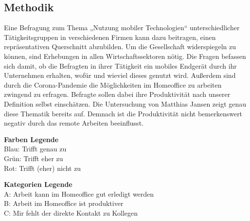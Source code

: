 \documentclass[12pt,a4paper]{article}
\begin{document}
\subsection*{Methodik}
Eine Befragung zum Thema „Nutzung mobiler Technologien“ unterschiedlicher Tätigkeitsgruppen in verschiedenen Firmen kann dazu beitragen, einen repräsentativen Querschnitt abzubilden.  
Um die Gesellschaft widerspiegeln zu können, sind Erhebungen in allen Wirtschaftssektoren nötig. 
Die Fragen befassen sich damit, ob die Befragten in ihrer Tätigkeit ein mobiles Endgerät durch ihr Unternehmen erhalten, wofür und wieviel dieses genutzt wird.  
Außerdem sind durch die Corona-Pandemie die Möglichkeiten im Homeoffice zu arbeiten zwingend zu erfragen.  
Befragte sollen dabei ihre Produktivität nach unserer Definition selbst einschätzen. 
Die Untersuchung von Matthias Jansen zeigt genau diese Thematik bereits auf. 
Demnach ist die Produktivität nicht bemerkenswert negativ durch das remote Arbeiten beeinflusst. 
 

\begin{center}
	\begin{multicols}{2}
		
		\columnbreak
		
		\raggedright
		\textbf{Farben Legende}\\
		Blau: Trifft genau zu\\
		Grün: Trifft eher zu\\
		Rot: Trifft (eher) nicht zu
		
		\textbf{Kategorien Legende}\\
		A: Arbeit kann im Homeoffice gut erledigt werden\\
		B: Arbeit im Homeoffice ist produktiver\\
		C: Mir fehlt der direkte Kontakt zu Kollegen
	\end{multicols}
\end{center}
\end{document}
